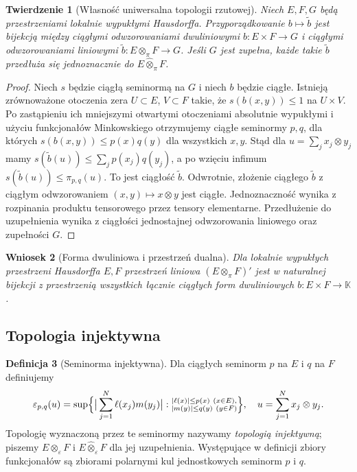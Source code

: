 \documentclass[11pt,a4paper]{article}
\numberwithin{equation}{section}
\theoremstyle{plain}
\newtheorem{twierdzenie}{Twierdzenie}[section]
\newtheorem{wniosek}[twierdzenie]{Wniosek}
\theoremstyle{definition}
\newtheorem{definicja}[twierdzenie]{Definicja}
\theoremstyle{remark}
\newcommand{\K}{\mathbb K}
\begin{document}
\begin{twierdzenie}[Własność uniwersalna topologii rzutowej]
\label{thm:pi-universal24}
Niech $E,F,G$ będą przestrzeniami lokalnie wypukłymi
Hausdorffa. Przyporządkowanie $b\mapsto\widetilde b$ jest bijekcją
między ciągłymi odwzorowaniami dwuliniowymi
$b:E\times F\to G$ i ciągłymi odwzorowaniami liniowymi
$\widetilde b:E\otimes_\pi F\to G$. Jeśli $G$ jest
zupełna, każde takie $\widetilde b$ przedłuża się jednoznacznie
do $E\widehat\otimes_\pi F$.
\end{twierdzenie}
\begin{proof}
Niech $s$ będzie ciągłą seminormą na $G$ i niech $b$
będzie ciągłe. Istnieją zrównoważone otoczenia zera
$U\subset E$, $V\subset F$ takie, że $s(b(x,y))\le1$
na $U\times V$. Po zastąpieniu ich mniejszymi otwartymi
otoczeniami absolutnie wypukłymi i użyciu funkcjonałów
Minkowskiego otrzymujemy ciągłe seminormy $p,q$,
dla których $s(b(x,y))\le p(x)q(y)$ dla wszystkich
$x,y$. Stąd dla $u=\sum_jx_j\otimes y_j$ mamy
$s(\widetilde b(u))\le\sum_jp(x_j)q(y_j)$,
a po wzięciu infimum $s(\widetilde b(u))\le\pi_{p,q}(u)$.
To jest ciągłość $\widetilde b$. Odwrotnie, złożenie
ciągłego $\widetilde b$ z ciągłym odwzorowaniem
$(x,y)\mapsto x\otimes y$ jest ciągłe.
Jednoznaczność wynika z rozpinania produktu tensorowego
przez tensory elementarne. Przedłużenie do uzupełnienia
wynika z ciągłości jednostajnej odwzorowania liniowego
oraz zupełności $G$.
\end{proof}

\begin{wniosek}[Forma dwuliniowa i przestrzeń dualna]
\label{cor:pi-dual24}
Dla lokalnie wypukłych przestrzeni Hausdorffa $E,F$
przestrzeń liniowa $(E\otimes_\pi F)'$ jest w naturalnej
bijekcji z przestrzenią wszystkich łącznie ciągłych form
dwuliniowych $b:E\times F\to\K$.
\end{wniosek}

\subsection{Topologia injektywna}

\begin{definicja}[Seminorma injektywna]
\label{def:eps-seminorm24}
Dla ciągłych seminorm $p$ na $E$ i $q$ na $F$ definiujemy
\[
 \varepsilon_{p,q}(u)=
 \sup\Bigl\{\big|\sum_{j=1}^N\ell(x_j)m(y_j)\big|:
 \substack{|\ell(x)|\le p(x)\ (x\in E),\\
             |m(y)|\le q(y)\ (y\in F)}\Bigr\},
 \quad u=\sum_{j=1}^N x_j\otimes y_j.
\]
Topologię wyznaczoną przez te seminormy nazywamy
\emph{topologią injektywną}; piszemy
$E\otimes_\varepsilon F$ i
$E\widehat\otimes_\varepsilon F$ dla jej uzupełnienia.
Występujące w definicji zbiory funkcjonałów są zbiorami
polarnymi kul jednostkowych seminorm $p$ i $q$.
\end{definicja}
\end{document}
